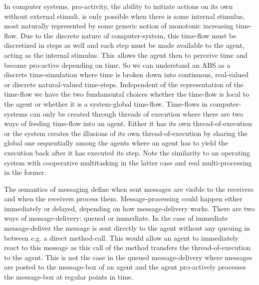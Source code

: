 In computer systems, pro-activity, the ability to initiate actions on its own without external stimuli, is only possible when there is some internal stimulus, most naturally represented by some generic notion of monotonic increasing time-flow. Due to the discrete nature of computer-system, this time-flow must be discretized in steps as well and each step must be made available to the agent, acting as the internal stimulus. This allows the agent then to perceive time and become pro-active depending on time. So we can understand an ABS as a discrete time-simulation where time is broken down into continuous, real-valued or discrete natural-valued time-steps. Independent of the representation of the time-flow we have the two fundamental choices whether the time-flow is local to the agent or whether it is a system-global time-flow. Time-flows in computer-systems can only be created through threads of execution where there are two ways of feeding time-flow into an agent. Either it has its own thread-of-execution or the system creates the illusions of its own thread-of-execution by sharing the global one sequentially among the agents where an agent has to yield the execution back after it has executed its step. Note the similarity to an operating system with cooperative multitasking in the latter case and real multi-processing in the former.

The semantics of messaging define when sent messages are visible to the receivers and when the receivers process them. Message-processing could happen either immediately or delayed, depending on how message-delivery works. There are two ways of message-delivery: queued or immediate. In the case of immediate message-deliver the message is sent directly to the agent without any queuing in between e.g. a direct method-call. This would allow an agent to immediately react to this message as this call of the method transfers the thread-of-execution to the agent. This is not the case in the queued message-delivery where messages are posted to the message-box of an agent and the agent pro-actively processes the message-box at regular points in time.

